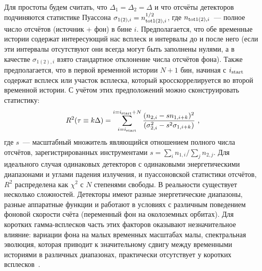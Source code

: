 Для простоты будем считать, что $\Delta_1 = \Delta_2 = \Delta$ и что отсчёты детекторов 
подчиняются статистике Пуассона $\sigma_{1(2),i} = n_{{\mathrm{tot }}1(2), i}^{1/2}$, 
где $n_{{\mathrm{tot }}1(2), i}$~--- полное число отсчётов (источник + фон) в бине $i$. 
Предполагается, что обе временные истории содержат интересующий нас всплеск и интервалы до и после него 
(если эти интервалы отсутствуют они всегда могут быть заполнены нулями, 
а в качестве $\sigma_{1(2),i}$ взято стандартное отклонение числа отсчётов фона).
Также предполагается, что в первой временной истории $N+1$ бин, начиная 
с $i_{\mathrm{start}}$ содержат всплеск или участок всплеска, 
который кросскоррелируется во второй временной истории. С учётом этих предположений 
можно сконструировать статистику:
\begin{equation}
R^2(\tau \equiv k\Delta) =  
\sum_{i=i_{\mathrm{start}}}^{i=i_{\mathrm{start}}+N} 
\frac{(n_{2,i} - s n_{1,i+k})^2}{(\sigma^2_{2,i} - s^2 \sigma_{1,i+k})} \mbox{ ,}
\end{equation}
где $s$~--- масштабный множитель являющийся отношением полного числа отсчётов, 
зарегистрированных инструментами $s = \sum_i n_{1,i} / \sum_j n_{2,j}$. 
Для идеального случая одинаковых детекторов с одинаковыми энергетическими диапазонами 
и углами падения излучения, и пуассоновской статистики отсчётов, $R^2$ распределена 
как $\chi^2$ с $N$ степенями свободы. В реальности существует несколько сложностей. 
Детекторы имеют разные энергетические диапазоны, разные аппаратные функции и работают 
в условиях с различным поведением фоновой скорости счёта (переменный фон на околоземных орбитах). 
Для коротких гамма-всплесков часть этих факторов оказывают незначительное влияние: 
вариации фона на малых временных масштабах малы, спектральная эволюция, которая 
приводит к значительному сдвигу между временными историями в различных диапазонах, 
практически отсутствует у коротких всплесков~\citep{Norris_2001grba}.

